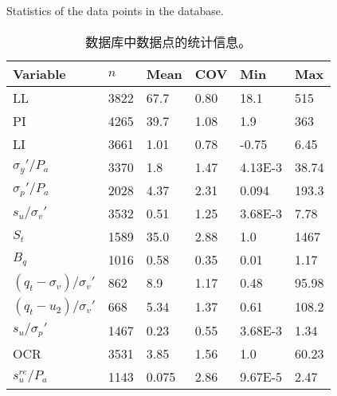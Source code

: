 \begin{table}[!htb]
    \centering
    \begin{minipage}[t]{0.44\textwidth}
        \centering
        \scriptsize
        \caption{Statistics of the data points in the database.}
        \addtocounter{table}{-1}
        \vspace{-8pt}
        \renewcommand{\tablename}{表}
        \caption{数据库中数据点的统计信息。}
        \vspace{4pt}
        \renewcommand{\tablename}{Table}
        \begin{tabular}{llllll}
            \toprule
            Variable                    & $n$   & Mean  & COV   & Min     & Max\\
            \midrule
            LL                          & 3822  & 67.7  & 0.80  & 18.1    & 515 \\
            PI                          & 4265  & 39.7  & 1.08  & 1.9     & 363 \\
            LI                          & 3661  & 1.01  & 0.78  & -0.75   & 6.45 \\
            $\sigma_y'/P_a$             & 3370  & 1.8   & 1.47  & 4.13E-3 & 38.74 \\
            $\sigma_p'/P_a$             & 2028  & 4.37  & 2.31  & 0.094   & 193.3 \\
            $s_u/\sigma_v'$             & 3532  & 0.51  & 1.25  & 3.68E-3 & 7.78 \\
            $S_t$                       & 1589  & 35.0  & 2.88  & 1.0     & 1467 \\
            $B_q$                       & 1016  & 0.58  & 0.35  & 0.01    & 1.17 \\
            $(q_t-\sigma_v)/\sigma_v'$  & 862   & 8.9   & 1.17  & 0.48    & 95.98 \\
            $(q_t-u_2)/\sigma_v'$       & 668   & 5.34  & 1.37  & 0.61    & 108.2 \\
            $s_u/\sigma_p'$             & 1467  & 0.23  & 0.55  & 3.68E-3 & 1.34 \\
            OCR                         & 3531  & 3.85  & 1.56  & 1.0     & 60.23 \\
            $s_u^{re}/P_a$              & 1143  & 0.075 & 2.86  & 9.67E-5 & 2.47 \\
            \bottomrule
        \end{tabular}%
        \label{table:3}%
    \end{minipage}
    \begin{minipage}[t]{0.55\textwidth}

\end{minipage}
\end{table}
